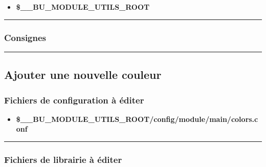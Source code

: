 \documentclass[a4paper,10pt]{article}
\begin{document}
    \begin{itemize}
        \item \textbf{\color{vars}\$\_\_BU\_MODULE\_UTILS\_ROOT\color{path}}
    \end{itemize}



    \color{sec3}\par\noindent\rule{\textwidth}{0.4pt}\color{text}

    \color{sec3}
    \subsubsection{Consignes}\color{text}




    \color{sec2}\par\noindent\rule{\textwidth}{0.4pt}\color{text}

    \color{sec2}
    \subsection{Ajouter une nouvelle couleur}\color{text}

    \color{sec3}
    \subsubsection{Fichiers de configuration à éditer}\color{text}

    \begin{itemize}
        \item \textbf{\color{vars}\$\_\_BU\_MODULE\_UTILS\_ROOT\color{path}/config/module/main/colors.conf}\\[1\baselineskip]
    \end{itemize}



    \color{sec3}\par\noindent\rule{\textwidth}{0.4pt}\color{text}

    \color{sec3}
    \subsubsection{Fichiers de librairie à éditer}\color{text}
\end{document}

